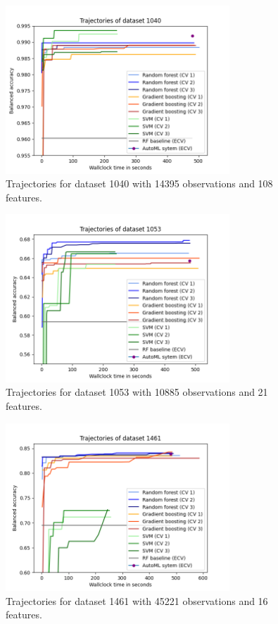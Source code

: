 \documentclass[11pt]{article}
\begin{document}
\begin{figure}[H]
 \centering
  \includegraphics[width=0.75\textwidth]{fig/plot_dataset_1040.png}
  \caption{Trajectories for dataset 1040 with 14395 observations and 108 features.}
\end{figure}

\begin{figure}[H]
 \centering
  \includegraphics[width=0.75\textwidth]{fig/plot_dataset_1053.png}
  \caption{Trajectories for dataset 1053 with 10885 observations and 21 features.}
\end{figure}

\begin{figure}[H]
 \centering
  \includegraphics[width=0.75\textwidth]{fig/plot_dataset_1461.png}
  \caption{Trajectories for dataset 1461 with 45221 observations and 16 features.}
\end{figure}
\end{document}
